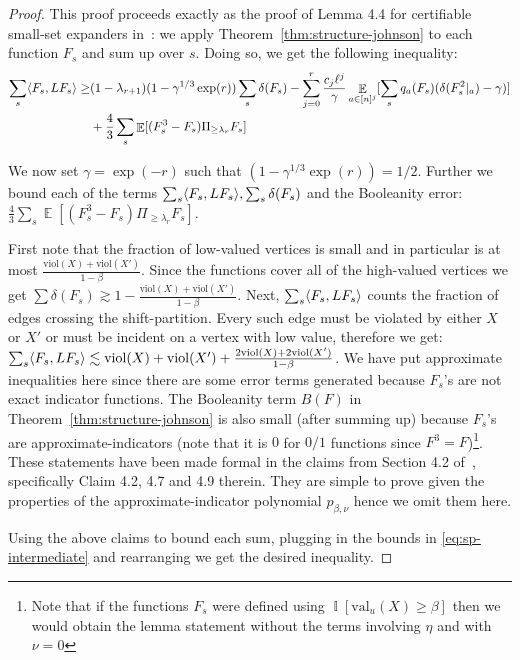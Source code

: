\documentclass[11pt]{article}
\DeclareMathOperator*{\E}{\mathbb{E}}
\DeclareMathOperator*{\Ind}{\mathbb{I}}
\DeclarePairedDelimiter\ip{\langle}{\rangle}
\def \val {\mathrm{val}}
\def \viol {\mathrm{viol}}
\theoremstyle{definition}
\begin{document}
\begin{proof}
This proof proceeds exactly as the proof of Lemma 4.4 for certifiable small-set expanders in~\cite{BBKSS}:
we apply Theorem~\ref{thm:structure-johnson} to each function $F_s$ and sum up over $s$. Doing so, we get the following inequality:
\begin{align}
\sum_s \ip{F_s, LF_s} \geq &(1 - \lambda_{r+1})(1- \gamma^{1/3}\exp(r))\sum_s \delta(F_s) - \sum_{j = 0}^r \frac{c_j \ell^j}{\gamma} \E_{a \in [n]^j}[\sum_{s}q_{a}(F_s)(\delta(F_s^{2}|_a) - \gamma)] \notag\\
&+ \frac{4}{3}\sum_s \E[(F_s^3 - F_s)\Pi_{\geq \lambda_r} F_{s}] \label{eq:sp-intermediate}
\end{align}

We now set $\gamma = \exp(-r)$ such that $(1-\gamma^{1/3}\exp(r)) = 1/2$. Further we bound each of the terms $\sum_s \ip{F_s, LF_s}, \sum_s \delta(F_s)$ and the Booleanity error: $\frac{4}{3}\sum_s \E[(F_s^3 - F_s)\Pi_{\geq \lambda_r} F_{s}]$.

First note that the fraction of low-valued vertices is small and in particular is at most $\frac{\viol(X)+\viol(X')}{1-\beta}$. Since the functions cover all of the high-valued vertices we get $\sum \delta(F_s) \gtrsim 1 - \frac{\viol(X) + \viol(X')}{1-\beta}$. Next, $\sum_s \ip{F_s, LF_s}$ counts the fraction of edges crossing the shift-partition. Every such edge must be violated by either $X$ or $X'$ or must be incident on a vertex with low value, therefore we get:  $\sum_s \ip{F_s, LF_s} \lesssim \viol(X)+\viol(X')+ \frac{2\viol(X)+2\viol(X')}{1-\beta}$.  We have put approximate inequalities here since there are some error terms generated because $F_s$'s are not exact indicator functions. 
The Booleanity term $B(F)$ in Theorem~\ref{thm:structure-johnson} is also small (after summing up) because $F_s$'s are approximate-indicators (note that it is $0$ for $0/1$ functions since $F^3 = F$)\footnote{Note that if the functions $F_s$ were defined using $\Ind[\val_u(X)\geq \beta]$ then we would obtain the lemma statement without the terms involving $\eta$ and with $\nu = 0$}. These statements have been made formal in the claims from Section 4.2 of~\cite{BBKSS}, specifically Claim 4.2, 4.7 and 4.9 therein. They are simple to prove given the properties of the approximate-indicator polynomial $p_{\beta,\nu}$ hence we omit them here. 

Using the above claims to bound each sum, plugging in the bounds in \eqref{eq:sp-intermediate} and rearranging we get the desired inequality.

\end{proof}
\end{document}
